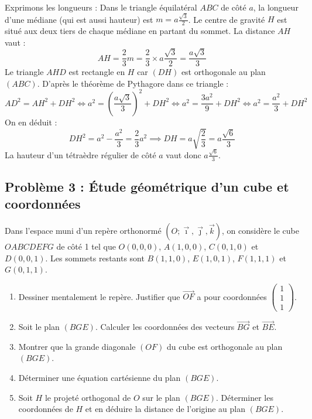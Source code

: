 \begin{enumerate}
    Exprimons les longueurs :
    Dans le triangle équilatéral $ABC$ de côté $a$, la longueur d'une médiane (qui est aussi hauteur) est $m = a \frac{\sqrt{3}}{2}$.
    Le centre de gravité $H$ est situé aux deux tiers de chaque médiane en partant du sommet. La distance $AH$ vaut :
    \[
    AH = \frac{2}{3} m = \frac{2}{3} \times a \frac{\sqrt{3}}{2} = \frac{a\sqrt{3}}{3}
    \]
    Le triangle $AHD$ est rectangle en $H$ car $(DH)$ est orthogonale au plan $(ABC)$. D'après le théorème de Pythagore dans ce triangle :
    \[
    AD^2 = AH^2 + DH^2 \iff a^2 = \left(\frac{a\sqrt{3}}{3}\right)^2 + DH^2 \iff a^2 = \frac{3a^2}{9} + DH^2 \iff a^2 = \frac{a^2}{3} + DH^2
    \]
    On en déduit :
    \[
    DH^2 = a^2 - \frac{a^2}{3} = \frac{2}{3}a^2 \implies DH = a \sqrt{\frac{2}{3}} = a\frac{\sqrt{6}}{3}
    \]
    La hauteur d'un tétraèdre régulier de côté $a$ vaut donc $a\frac{\sqrt{6}}{3}$.
\end{enumerate}

\subsection*{Problème 3 : Étude géométrique d'un cube et coordonnées}
Dans l'espace muni d'un repère orthonormé $(O; \vec{\imath}, \vec{\jmath}, \vec{k})$, on considère le cube $OABCDEFG$ de côté 1 tel que $O(0,0,0)$, $A(1,0,0)$, $C(0,1,0)$ et $D(0,0,1)$.
Les sommets restants sont $B(1,1,0)$, $E(1,0,1)$, $F(1,1,1)$ et $G(0,1,1)$.
\begin{enumerate}
    \item Dessiner mentalement le repère. Justifier que $\vec{OF}$ a pour coordonnées $\begin{pmatrix} 1 \\ 1 \\ 1 \end{pmatrix}$.
    \item Soit le plan $(BGE)$. Calculer les coordonnées des vecteurs $\vec{BG}$ et $\vec{BE}$.
    \item Montrer que la grande diagonale $(OF)$ du cube est orthogonale au plan $(BGE)$.
    \item Déterminer une équation cartésienne du plan $(BGE)$.
    \item Soit $H$ le projeté orthogonal de $O$ sur le plan $(BGE)$. Déterminer les coordonnées de $H$ et en déduire la distance de l'origine au plan $(BGE)$.
\end{enumerate}

